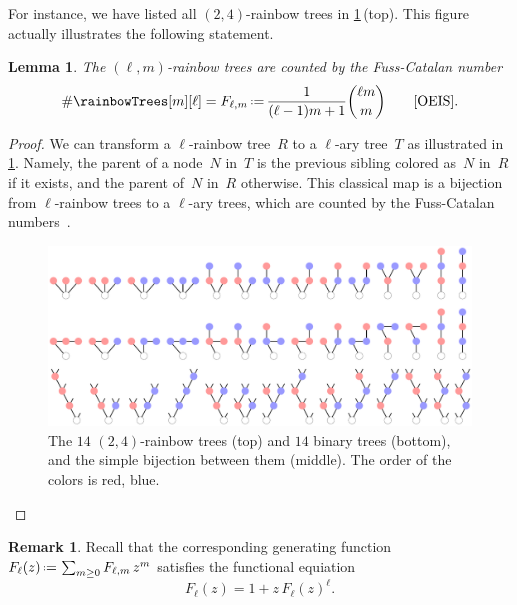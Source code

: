 \documentclass{amsart}
\newcommand{\darkblue}{\color{darkblue}} %
\newtheorem{lemma}[theorem]{Lemma}
\theoremstyle{definition}
\newtheorem{remark}[theorem]{Remark}
\newcommand{\eqdef}{\mbox{\,\raisebox{0.2ex}{\scriptsize\ensuremath{\mathrm:}}\ensuremath{=}\,}} %
\newcommand{\defn}[1]{\textsl{\darkblue #1}} %
\newcommand{\OEIS}[1]{\cite[{\rm \href{http://oeis.org/#1}{\texttt{#1}}}]{OEIS}}
\begin{document}
For instance, we have listed all $(2,4)$-rainbow trees in \cref{fig:rainbowTrees}\,(top).
This figure actually illustrates the following statement.

\begin{lemma}
\label{lem:FussCatalan}
The $(\ell,m)$-rainbow trees are counted by the \defn{Fuss-Catalan number}
\[
\# \rainbowTrees[m][\ell] = F_{\ell,m} \eqdef \frac{1}{(\ell-1)m+1} \binom{\ell m}{m} \qquad \text{\OEIS{A062993}}.
\]
\end{lemma}

\begin{proof}
We can transform a $\ell$-rainbow tree~$R$ to a $\ell$-ary tree~$T$ as illustrated in \cref{fig:rainbowTrees}.
Namely, the parent of a node~$N$ in~$T$ is the previous sibling colored as~$N$ in~$R$ if it exists, and the parent of~$N$ in~$R$ otherwise.
This classical map is a bijection from $\ell$-rainbow trees to a $\ell$-ary trees, which are counted by the Fuss-Catalan numbers~\cite{Klarner, HiltonPedersen}.
%
\begin{figure}
	\centerline{\includegraphics[scale=.7]{rainbowTrees}}
	\caption{The $14$ $(2,4)$-rainbow trees (top) and $14$ binary trees (bottom), and the simple bijection between them (middle). The order of the colors is red, blue.}
	\label{fig:rainbowTrees}
\end{figure}
\end{proof}

\begin{remark}
\label{rem:functionalEquationFussCatalan}
Recall that the corresponding generating function~$F_\ell(z) \eqdef \sum_{m \ge 0} F_{\ell,m} \, z^m$ satisfies the functional equiation
\[
F_\ell(z) = 1 + z \, F_\ell(z)^\ell.
\]
\end{remark}
\end{document}

